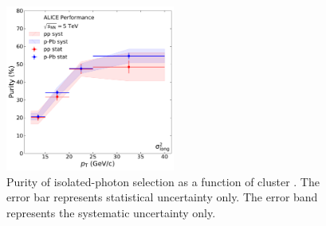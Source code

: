 








\begin{figure}[h]
\center
\includegraphics[width=0.495\textwidth]{Purity/purities-combined-cluster_Lambda.pdf}
\caption{Purity of isolated-photon selection as a function of cluster \pt. The error bar represents statistical uncertainty only. The error band represents the systematic uncertainty only.}
\label{fig:purityresults}
\end{figure}


